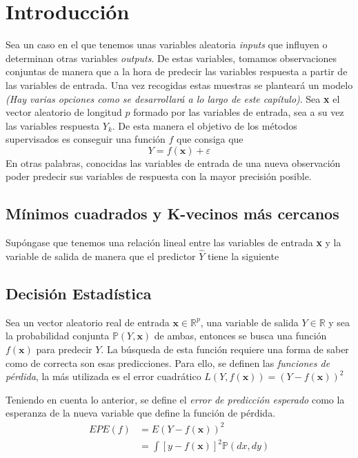 \section{Introducción}
\noindent Sea un caso en el que tenemos unas variables aleatoria \textit{inputs} que influyen o determinan otras variables \textit{outputs}. De estas variables, tomamos observaciones conjuntas de manera que a la hora de predecir las variables respuesta a partir de las variables de entrada. Una vez recogidas estas muestras se planteará un modelo \textit{(Hay varias opciones como se desarrollará a lo largo de este capítulo)}.
\noindent Sea \textbf{x} el vector aleatorio de longitud $p$ formado por las variables de entrada, sea a su vez las variables respuesta $Y_k$. De esta manera el objetivo de los métodos supervisados es conseguir una función $f$ que consiga que \begin{equation}
Y=f(\textbf{x})+\varepsilon
\end{equation}
En otras palabras, conocidas las variables de entrada de una nueva observación poder predecir sus variables de respuesta con la mayor precisión posible. 
\subsection{Mínimos cuadrados y K-vecinos más cercanos}
\noindent Supóngase que tenemos una relación lineal entre las variables de entrada \textbf{x} y la variable de salida de manera que el predictor $\hat{Y}$ tiene la siguiente
\subsection{Decisión Estadística}
\noindent Sea un vector aleatorio real de entrada $\textbf{x}\in\mathbb{R}^p$, una variable de salida $Y\in\mathbb{R}$ y sea la probabilidad conjunta $\mathbb{P}(Y,\textbf{x})$ de ambas, entonces se busca una función $f(\textbf{x})$ para predecir $Y$. La búsqueda de esta función requiere una forma de saber como de correcta son esas predicciones. Para ello, se definen las \textit{funciones de pérdida}, la más utilizada es el error cuadrático $L(Y,f(\textbf{x}))=(Y-f(\textbf{x}))^2$
\begin{defi}
Teniendo en cuenta lo anterior, se define el \textit{error de predicción esperado} como la esperanza de la nueva variable que define la función de pérdida.
\begin{equation}
\begin{split}
EPE(f)& = E(Y-f(\textbf{x}))^2\\
&= \int [y-f(\textbf{x})]^2\mathbb{P}(dx,dy)
\end{split}
\end{equation}
\end{defi}

